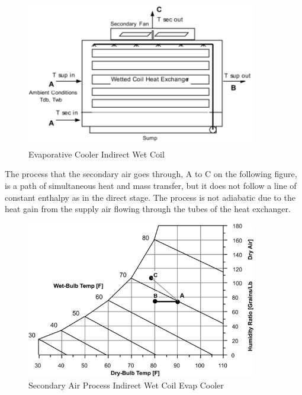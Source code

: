 \begin{figure}[hbtp] %
\centering
\includegraphics[width=0.9\textwidth, height=0.9\textheight, keepaspectratio=true]{media/image421.png}
\caption{Evaporative Cooler Indirect Wet Coil \protect \label{fig:evaporative-cooler-indirect-wet-coil}}
\end{figure}

The process that the secondary air goes through, A to C on the following figure, is a path of simultaneous heat and mass transfer, but it does not follow a line of constant enthalpy as in the direct stage. The process is not adiabatic due to the heat gain from the supply air flowing through the tubes of the heat exchanger.

\begin{figure}[hbtp] %
\centering
\includegraphics[width=0.9\textwidth, height=0.9\textheight, keepaspectratio=true]{media/image422.png}
\caption{Secondary Air Process Indirect Wet Coil Evap Cooler \protect \label{fig:secondary-air-process-indirect-wet-coil-evap}}
\end{figure}

